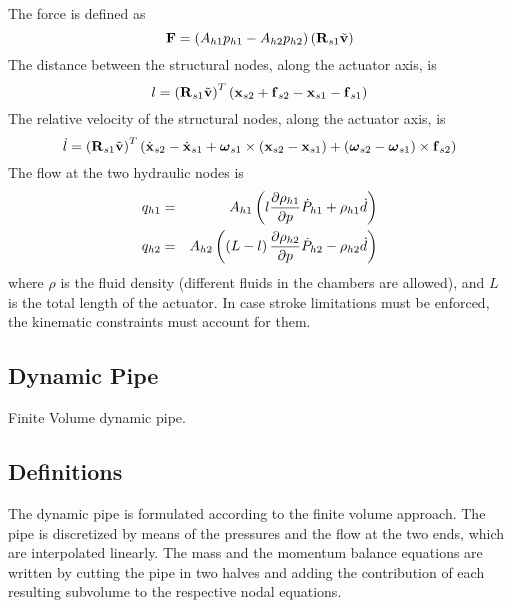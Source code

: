 \documentclass[10pt,dvips,fleqn,subeqn]{report}
\newcommand{\T}[1]{\bm{\mathbf{#1}}}
\begin{document}
The force is defined as
\begin{equation}
	\T{F} = \plbr{A_{h1} p_{h1} - A_{h2} p_{h2}}
		\plbr{\T{R}_{s1} \tilde{\T{v}}}
\end{equation}
The distance between the structural nodes, along the actuator axis, is
\begin{equation}
	l = \plbr{\T{R}_{s1} \tilde{\T{v}}}^T \plbr{
		\T{x}_{s2} + \T{f}_{s2} - \T{x}_{s1} - \T{f}_{s1}
	}
\end{equation}
The relative velocity of the structural nodes, along the actuator axis, is
\begin{equation}
	\dot{l} = \plbr{\T{R}_{s1} \tilde{\T{v}}}^T \plbr{
		\dot{\T{x}}_{s2} - \dot{\T{x}}_{s1} 
		+ \T{\omega}_{s1}\times\plbr{\T{x}_{s2} - \T{x}_{s1}}
		+ \plbr{\T{\omega}_{s2} - \T{\omega}_{s1}}\times\T{f}_{s2}
	}
\end{equation}
The flow at the two hydraulic nodes is
\begin{eqnarray*}
	q_{h1} & = & A_{h1} \left( 
		l \frac{\partial\rho_{h1}}{\partial{p}}\dot{P}_{h1}
		+ \rho_{h1} \dot{d}
	 \right) \\
	q_{h2} & = & A_{h2} \left( 
		\left( L - l \right) \frac{\partial\rho_{h2}}{\partial{p}}\dot{P}_{h2}
		- \rho_{h2} \dot{d}
	 \right)
\end{eqnarray*}
where $\rho$ is the fluid density (different fluids in the chambers 
are allowed), and $L$ is the total length of the actuator.
In case stroke limitations must be enforced, the kinematic 
constraints must account for them.


\subsection{Dynamic Pipe}
Finite Volume dynamic pipe.

\subsection{Definitions}
The dynamic pipe is formulated according to the finite volume approach.
The pipe is discretized by means of the pressures and the flow 
at the two ends, which are interpolated linearly.
The mass and the momentum balance equations are written by cutting
the pipe in two halves and adding the contribution of each resulting
subvolume to the respective nodal equations.
\end{document}
